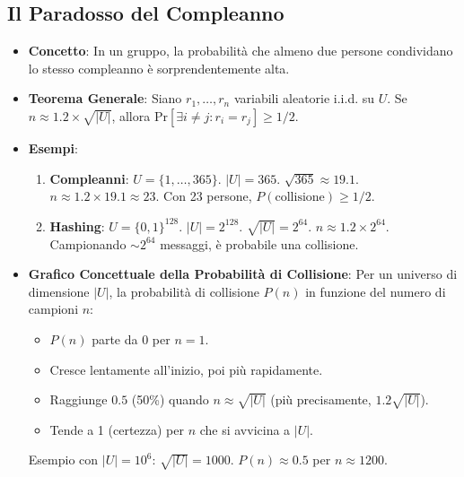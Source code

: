 \subsection{Il Paradosso del Compleanno}
\begin{itemize}
    \item \textbf{Concetto}: In un gruppo, la probabilità che almeno due persone condividano lo stesso compleanno è sorprendentemente alta.
    \item \textbf{Teorema Generale}: Siano $r_1, \dots, r_n$ variabili aleatorie i.i.d. su $U$.
    Se $n \approx 1.2 \times \sqrt{|U|}$, allora $\text{Pr}[\exists i \neq j : r_i = r_j] \ge 1/2$.
    \item \textbf{Esempi}:
    \begin{enumerate}
        \item \textbf{Compleanni}: $U = \{1, \dots, 365\}$. $|U|=365$. $\sqrt{365} \approx 19.1$. $n \approx 1.2 \times 19.1 \approx 23$. Con 23 persone, $P(\text{collisione}) \ge 1/2$.
        \item \textbf{Hashing}: $U = \{0,1\}^{128}$. $|U|=2^{128}$. $\sqrt{|U|} = 2^{64}$. $n \approx 1.2 \times 2^{64}$. Campionando $\sim 2^{64}$ messaggi, è probabile una collisione.
    \end{enumerate}
    \item \textbf{Grafico Concettuale della Probabilità di Collisione}:
    Per un universo di dimensione $|U|$, la probabilità di collisione $P(n)$ in funzione del numero di campioni $n$:
    \begin{itemize}
        \item $P(n)$ parte da 0 per $n=1$.
        \item Cresce lentamente all'inizio, poi più rapidamente.
        \item Raggiunge $0.5$ (50\%) quando $n \approx \sqrt{|U|}$ (più precisamente, $1.2 \sqrt{|U|}$).
        \item Tende a 1 (certezza) per $n$ che si avvicina a $|U|$.
    \end{itemize}
    Esempio con $|U|=10^6$: $\sqrt{|U|} = 1000$. $P(n) \approx 0.5$ per $n \approx 1200$.
    \begin{center}
\end{center}
\end{itemize}
